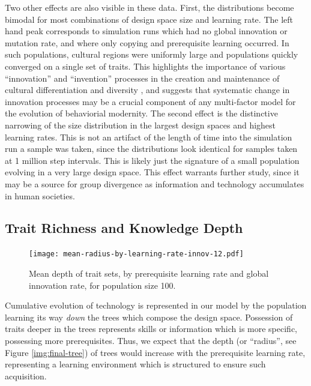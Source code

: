\documentclass[graybox,natbib]{svmult}
\begin{document}
Two other effects are also visible in these data. First, the
distributions become bimodal for most combinations of design space size
and learning rate. The left hand peak corresponds to simulation runs
which had no global innovation or mutation rate, and where only copying
and prerequisite learning occurred. In such populations, cultural
regions were uniformly large and populations quickly converged on a
single set of traits. This highlights the importance of various
``innovation'' and ``invention'' processes in the creation and
maintenance of cultural differentiation and diversity
\citep{eerkens2005cultural, o2010innovation}, and suggests that
systematic change in innovation processes may be a crucial component of
any multi-factor model for the evolution of behaviorial modernity. The
second effect is the distinctive narrowing of the size distribution in
the largest design spaces and highest learning rates. This is not an
artifact of the length of time into the simulation run a sample was
taken, since the distributions look identical for samples taken at 1
million step intervals. This is likely just the signature of a small
population evolving in a very large design space. This effect warrants
further study, since it may be a source for group divergence as
information and technology accumulates in human societies.

\subsection{Trait Richness and Knowledge
Depth}\label{trait-richness-and-knowledge-depth}

\begin{figure}[h] 
\centering 
\texttt{[image: mean-radius-by-learning-rate-innov-12.pdf]} 
\caption{Mean depth of trait sets, by prerequisite learning rate and global innovation rate, for population size 100.} 
\label{img:mean-radius-cultures-100} 
\end{figure}

Cumulative evolution of technology is represented in our model by the
population learning its way \emph{down} the trees which compose the
design space. Possession of traits deeper in the trees represents skills
or information which is more specific, possessing more prerequisites.
Thus, we expect that the depth (or ``radius'', see Figure
\ref{img:final-tree}) of trees would increase with the prerequisite
learning rate, representing a learning environment which is structured
to ensure such acquisition.
\end{document}
